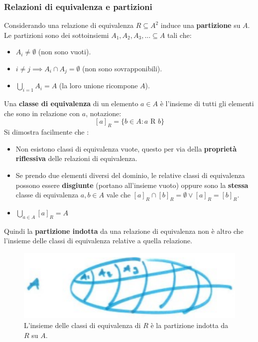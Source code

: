 \documentclass{article}
\begin{document}
\subsubsection{Relazioni di equivalenza e partizioni}
Considerando una relazione di equivalenza $R\subseteq A^2$ induce una
\textbf{partizione} su $A$.
Le partizioni sono dei sottoinsiemi $A_1,A_2,A_3,...\subseteq A$ tali che:
\begin{itemize}
    \item $A_i\neq\emptyset$ (non sono vuoti).
    \item $i\neq j\implies A_i \cap A_j =\emptyset$ (non sono sovrapponibili).
    \item $\bigcup\limits_{i=1} A_i=A$ (la loro unione ricompone $A$).
\end{itemize}

Una \textbf{classe di equivalenza} di un elemento $a\in A$ è l'insieme di tutti
gli elementi che sono in relazione con $a$, notazione:
$$[a]_R=\{b\in A: a\text{ R }b\}$$
Si dimostra facilmente che :
\begin{itemize}
    \item Non esistono classi di equivalenza vuote, questo per via della \textbf{proprietà
          riflessiva} delle relazioni di equivalenza.
    \item Se prendo due elementi diversi del dominio, le relative classi di equivalenza
          possono essere \textbf{disgiunte} (portano all'insieme vuoto) oppure sono la \textbf{stessa} classe di equivalenza $a,b\in A$ vale che
          $[a]_R\cap[b]_R=\emptyset\lor[a]_R = [b]_R$.
    \item $\bigcup\limits_{a\in A}[a]_R=A$
\end{itemize}
Quindi la \textbf{partizione indotta} da una relazione di equivalenza non è altro che l'insieme
delle classi di equivalenza relative a quella relazione.
\begin{figure}[H]
    \centering
    \includegraphics[scale=0.4]{images/rel_equi_graph.png}
    \caption{L'insieme delle classi di equivalenza di $R$ è la partizione indotta da $R$ su $A$.}
\end{figure}
\end{document}
